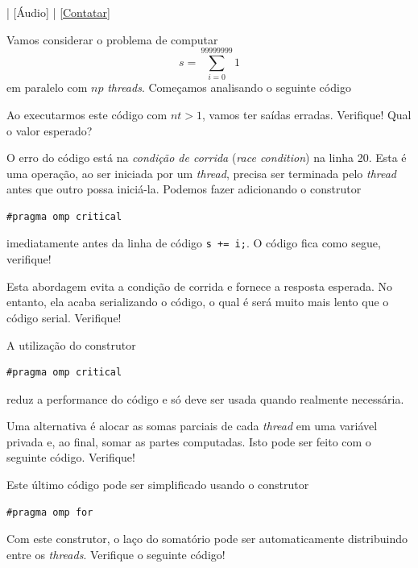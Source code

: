 \begin{flushright}
  [Vídeo] | [Áudio] | \href{https://phkonzen.github.io/notas/contato.html}{[Contatar]}
\end{flushright}

Vamos considerar o problema de computar
\begin{equation}
  s = \sum_{i=0}^{99999999} 1
\end{equation}
em paralelo com $np$ {\it threads}. Começamos analisando o seguinte código



Ao executarmos este código com $nt > 1$, vamos ter saídas erradas. Verifique! Qual o valor esperado?

O erro do código está na \emph{condição de corrida} ({\it race condition}) na linha 20. Esta é uma operação, ao ser iniciada por um {\it thread}, precisa ser terminada pelo {\it thread} antes que outro possa iniciá-la. Podemos fazer adicionando o construtor
\begin{verbatim}
#pragma omp critical
\end{verbatim}
imediatamente antes da linha de código \verb-s += i;-. O código fica como segue, verifique!



Esta abordagem evita a condição de corrida e fornece a resposta esperada. No entanto, ela acaba serializando o código, o qual é será muito mais lento que o código serial. Verifique!

\begin{obs}
  A utilização do construtor
\begin{verbatim}
#pragma omp critical
\end{verbatim}
  reduz a performance do código e só deve ser usada quando realmente necessária.
\end{obs}

Uma alternativa é alocar as somas parciais de cada {\it thread} em uma variável privada e, ao final, somar as partes computadas. Isto pode ser feito com o seguinte código. Verifique!



Este último código pode ser simplificado usando o construtor
\begin{verbatim}
#pragma omp for
\end{verbatim}
Com este construtor, o laço do somatório pode ser automaticamente distribuindo entre os {\it threads}. Verifique o seguinte código!

